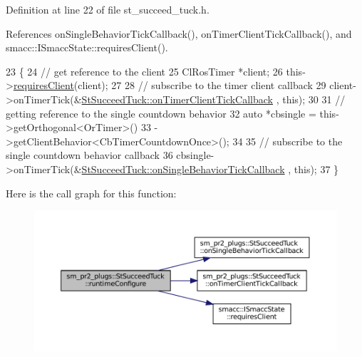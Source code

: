 Definition at line 22 of file st\+\_\+succeed\+\_\+tuck.\+h.



References on\+Single\+Behavior\+Tick\+Callback(), on\+Timer\+Client\+Tick\+Callback(), and smacc\+::\+I\+Smacc\+State\+::requires\+Client().


\begin{DoxyCode}
23     \{
24         \textcolor{comment}{// get reference to the client}
25         ClRosTimer *client;
26         this->\hyperlink{classsmacc_1_1ISmaccState_a7f95c9f0a6ea2d6f18d1aec0519de4ac}{requiresClient}(client);
27 
28         \textcolor{comment}{// subscribe to the timer client callback}
29         client->onTimerTick(&\hyperlink{structsm__pr2__plugs_1_1StSucceedTuck_af9f7556acf968aaa20d4e3eafda7f3ef}{StSucceedTuck::onTimerClientTickCallback}
      , \textcolor{keyword}{this});
30 
31         \textcolor{comment}{// getting reference to the single countdown behavior}
32         \textcolor{keyword}{auto} *cbsingle = this->getOrthogonal<OrTimer>()
33                              ->getClientBehavior<CbTimerCountdownOnce>();
34 
35         \textcolor{comment}{// subscribe to the single countdown behavior callback}
36         cbsingle->onTimerTick(&\hyperlink{structsm__pr2__plugs_1_1StSucceedTuck_a2f78ac55b1c5431bfdd20f20c5030815}{StSucceedTuck::onSingleBehaviorTickCallback}
      , \textcolor{keyword}{this});
37     \}
\end{DoxyCode}
Here is the call graph for this function\+:
\nopagebreak
\begin{figure}[H]
\begin{center}
\leavevmode
\includegraphics[width=350pt]{structsm__pr2__plugs_1_1StSucceedTuck_a1cdbe59c4fb6a107b2886745c13e6bc1_cgraph}
\end{center}
\end{figure}
\mbox{\label{structsm__pr2__plugs_1_1StSucceedTuck_a2578c44b2fa3443560def76f6d2bdef3}} 
